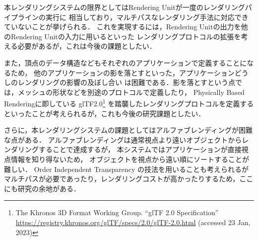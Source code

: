 本レンダリングシステムの限界としてはRendering Unitが一度のレンダリングパイプラインの実行に
相当しており，マルチパスなレンダリング手法に対応できていないことが挙げられる．
これを実現するには，Rendering Unitの出力を他のRendering Unitの入力に用いるといった
レンダリングプロトコルの拡張を考える必要があるが，これは今後の課題としたい．

また，頂点のデータ構造などもそれぞれのアプリケーションで定義することになるため，
他のアプリケーションの影を落とすといった，アプリケーションどうしのレンダリングの影響の及ぼし合い
は困難である．影を落とすという点では，メッシュの形状などを別途のプロトコルで定義したり，
Physically Based Rendering\cite{physically-based-rendering}に即している
glTF2.0\footnote{The Khronos 3D Format Working Group. ``glTF 2.0 Specification'' \url{https://registry.khronos.org/glTF/specs/2.0/glTF-2.0.html} (accessed 23 Jan, 2023)}
を踏襲したレンダリングプロトコルを定義するといったことが考えられるが，これも今後の研究課題としたい．

さらに，本レンダリングシステムの課題としてはアルファブレンディングが困難な点がある．
アルファブレンディングは通常視点より遠いオブジェクトからレンダリングすることで達成するが，
本システムではアプリケーションが直接視点情報を知り得ないため，
オブジェクトを視点から遠い順にソートすることが難しい．
Order Independent Transparency の技法を用いることも考えられるが
マルチパスが必要であったり，レンダリングコストが高かったりするため，ここにも研究の余地がある．
